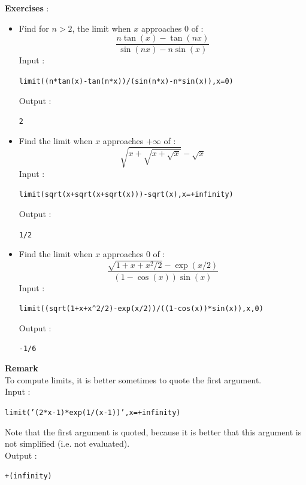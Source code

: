 \documentclass[a4paper,11pt]{book}
\begin{document}
{\bf Exercises} :
\begin{itemize}
\item Find for $n>2$, the limit  when $x$ approaches $0$ of :
$$ \frac{n\tan(x)-\tan(nx)}{\sin(nx)-n\sin(x)}$$
Input :
\begin{center}{\tt limit((n*tan(x)-tan(n*x))/(sin(n*x)-n*sin(x)),x=0)}\end{center}
Output :
\begin{center}{\tt 2 }\end{center}
\item Find the limit  when $x$ approaches $+\infty$ of :
$$\sqrt{x+\sqrt{x+\sqrt x}}-\sqrt x$$ 
Input :
\begin{center}{\tt limit(sqrt(x+sqrt(x+sqrt(x)))-sqrt(x),x=+infinity)}\end{center}
Output :
\begin{center}{\tt 1/2 }\end{center}
\item Find the limit  when $x$ approaches 0 of :
$$\frac{\sqrt{1+x+x^2/2}-\exp(x/2)}{(1-\cos(x))\sin(x)}$$ 
Input :
\begin{center}{\tt limit((sqrt(1+x+x\verb|^|2/2)-exp(x/2))/((1-cos(x))*sin(x)),x,0)}\end{center}
Output :
\begin{center}{\tt -1/6 }\end{center}
\end{itemize}

{\bf Remark}\\
To compute limits, it is better sometimes to quote the first argument.\\  
Input  :
\begin{center}{\tt limit('(2*x-1)*exp(1/(x-1))',x=+infinity)}\end{center}
Note that the first argument is quoted,  because it is better that
this argument is not simplified (i.e. not evaluated).\\
Output :
\begin{center}{\tt +(infinity)}\end{center}
\end{document}
